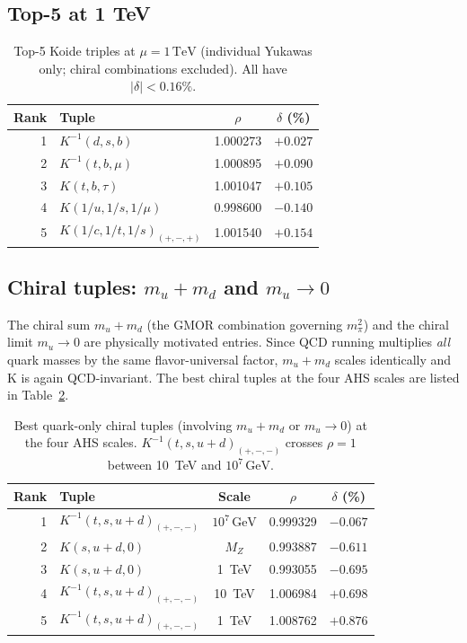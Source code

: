 \documentclass[11pt,a4paper]{article}
\newcommand{\TeV}{\,\text{TeV}}
\newcommand{\GeV}{\,\text{GeV}}
\newcommand{\MZ}{M_Z}
\begin{document}
\subsection{Top-5 at 1 TeV}

\begin{table}[H]
\centering
\footnotesize
\begin{tabular}{rlcc}
\toprule
Rank & Tuple & $\rho$ & $\delta$ (\%) \\
\midrule
1 & $K^{-1}(d, s, b)$            & 1.000273 & $+0.027$ \\
2 & $K^{-1}(t, b, \mu)$          & 1.000895 & $+0.090$ \\
3 & $K(t, b, \tau)$              & 1.001047 & $+0.105$ \\
4 & $K(1/u, 1/s, 1/\mu)$        & 0.998600 & $-0.140$ \\
5 & $K(1/c, 1/t, 1/s)_{(+,-,+)}$ & 1.001540 & $+0.154$ \\
\bottomrule
\end{tabular}
\caption{Top-5 Koide triples at $\mu = 1\TeV$ (individual Yukawas only;
  chiral combinations excluded). All have $|\delta| < 0.16\%$.}
\label{tab:top5_1tev}
\end{table}

\subsection{Chiral tuples: $m_u{+}m_d$ and $m_u{\to}0$}

The chiral sum $m_u{+}m_d$ (the GMOR combination governing $m_\pi^2$)
and the chiral limit $m_u{\to}0$ are physically motivated entries.
Since QCD running multiplies \emph{all} quark masses by the same
flavor-universal factor, $m_u{+}m_d$ scales identically and K is
again QCD-invariant.  The best chiral tuples at the four AHS scales
are listed in Table~\ref{tab:exotic_ahs}.

\begin{table}[H]
\centering
\footnotesize
\begin{tabular}{rlccc}
\toprule
Rank & Tuple & Scale & $\rho$ & $\delta$ (\%) \\
\midrule
1 & $K^{-1}(t,s,u{+}d)_{(+,-,-)}$ & $10^7\GeV$ & 0.999329 & $-0.067$ \\
2 & $K(s,u{+}d,0)$                 & $\MZ$       & 0.993887 & $-0.611$ \\
3 & $K(s,u{+}d,0)$                 & 1~TeV       & 0.993055 & $-0.695$ \\
4 & $K^{-1}(t,s,u{+}d)_{(+,-,-)}$ & 10~TeV      & 1.006984 & $+0.698$ \\
5 & $K^{-1}(t,s,u{+}d)_{(+,-,-)}$ & 1~TeV       & 1.008762 & $+0.876$ \\
\bottomrule
\end{tabular}
\caption{Best quark-only chiral tuples (involving $m_u{+}m_d$ or
  $m_u{\to}0$) at the four AHS scales. $K^{-1}(t,s,u{+}d)_{(+,-,-)}$
  crosses $\rho = 1$ between 10~TeV and $10^7\GeV$.}
\label{tab:exotic_ahs}
\end{table}
\end{document}
